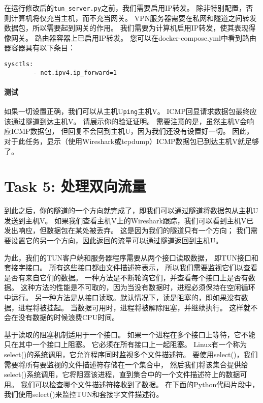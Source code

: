 在运行修改后的\verb|tun_server.py|之前，我们需要启用IP转发。
除非特别配置，否则计算机将仅充当主机，而不充当网关。 
VPN服务器需要在私网和隧道之间转发数据包，所以需要起到网关的作用。
我们需要为计算机启用IP转发，使其表现得像网关。
路由器容器上已启用IP转发。
您可以在docker-compose.yml中看到路由器容器具有以下条目：

\begin{lstlisting}
sysctls:
        - net.ipv4.ip_forward=1
\end{lstlisting}

\paragraph{测试} 如果一切设置正确，我们可以从主机U\verb|ping|主机V。
ICMP回显请求数据包最终应该通过隧道到达主机V。 
请展示你的验证证明。 
需要注意的是，虽然主机V会响应ICMP数据包，
但回复不会回到主机U，因为我们还没有设置好一切。 
因此，对于此任务，显示（使用Wireshark或tcpdump）ICMP数据包已到达主机V就足够了。

\section{Task 5: 处理双向流量} 

到此之后，你的隧道的一个方向就完成了，即我们可以通过隧道将数据包从主机U发送到主机V。
如果我们查看主机V上的Wireshark跟踪，我们可以看到主机V已发出响应，但数据包在某处被丢弃。
这是因为我们的隧道只有一个方向；
我们需要设置它的另一个方向，因此返回的流量可以通过隧道返回到主机U。

为此，我们的TUN客户端和服务器程序需要从两个接口读取数据，
即TUN接口和套接字接口。
所有这些接口都由文件描述符表示，
所以我们需要监视它们以查看是否有来自它们的数据。
一种方法是不断轮询它们，并查看每个接口上是否有数据。
这种方法的性能是不可取的，因为当没有数据时，进程必须保持在空闲循环中运行。
另一种方法是从接口读取。默认情况下，读是阻塞的，即如果没有数据，进程将被挂起。
当数据可用时，进程将被解除阻塞，并继续执行。
这样就不会在没有数据的时候浪费CPU时间。

基于读取的阻塞机制适用于一个接口。
如果一个进程在多个接口上等待，它不能只在其中一个接口上阻塞。
它必须在所有接口上一起阻塞。 
Linux有一个称为select()的系统调用，它允许程序同时监视多个文件描述符。
要使用select()，我们需要将所有要监视的文件描述符存储在一个集合中，
然后我们将该集合提供给select()系统调用，它将阻塞该进程，直到集合中的一个文件描述符上的数据可用。
我们可以检查哪个文件描述符接收到了数据。
在下面的Python代码片段中，我们使用select()来监控TUN和套接字文件描述符。

